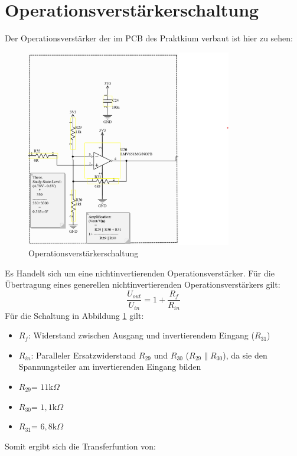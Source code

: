 \section{Operationsverstärkerschaltung} %
Der Operationsverstärker der im PCB des Praktkium verbaut ist hier zu sehen:
\begin{figure}[H]
    \centering
    \includegraphics[width=0.8\textwidth]{Pictures/OP_Verstaerker.png}
    \caption{Operationsverstärkerschaltung}
    \label{fig:opamp_schaltung}
\end{figure}
Es Handelt sich um eine nichtinvertierenden Operationsverstärker.
Für die Übertragung eines generellen nichtinvertierenden Operationsverstärkers gilt:
\begin{equation}
    \frac{U_{out}}{U_{in}} = 1 + \frac{R_f}{R_{in}}
\end{equation}
Für die Schaltung in Abbildung \ref{fig:opamp_schaltung} gilt:
\begin{itemize}
    \item $R_f$: Widerstand zwischen Ausgang und invertierendem Eingang ($R_{31}$)
    \item $R_{in}$: Paralleler Ersatzwiderstand $R_{29}$ und $R_{30}$ ($R_{29}\parallel R_{30}$), da sie den Spannungsteiler am invertierenden Eingang bilden
    \item $R_{29}$= $11 \mathrm{k}\Omega$
    \item $R_{30}$= $1,1 \mathrm{k}\Omega$
    \item $R_{31}$= $6,8 \mathrm{k}\Omega$
\end{itemize}
Somit ergibt sich die Transferfuntion von:

